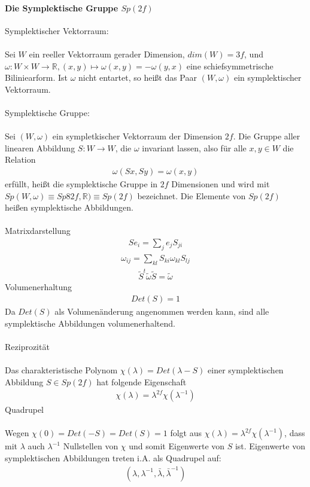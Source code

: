 \documentclass[10pt,a4paper]{article}
\begin{document}
\paragraph{Die Symplektische Gruppe $Sp(2f)$} $\,$\\
Symplektischer Vektorraum:\\
\\
Sei $W$ ein reeller Vektorraum gerader Dimension, $dim(W)=3f$, und $\omega: W \times W \longrightarrow \mathbb{R}, (x,y) \longmapsto \omega (x,y)=-\omega (y,x) $ eine schiefsymmetrische Biliniearform. Ist $\omega
$ nicht entartet, so heißt das Paar $ (W,\omega)$ ein symplektischer Vektorraum.\\
\\
Symplektische Gruppe: \\
\\
Sei $(W,\omega)$ ein sympletkischer Vektorraum der Dimension $2f$. Die Gruppe aller linearen Abbildung $S:W \longrightarrow W$, die $\omega$ invariant lassen, also für alle $x,y \in W$ die Relation
\begin{align}
\omega(Sx,Sy)=\omega(x,y)
\end{align}
erfüllt, heißt die symplektische Gruppe in $2f$ Dimensionen und wird mit $ Sp(W,\omega) \equiv Sp82f, \mathbb{R}) \equiv Sp(2f)$ bezeichnet. Die Elemente von $Sp(2f) $ heißen symplektische Abbildungen.\\
\\
Matrixdarstellung
\begin{align}
Se_i= \sum_j e_j S_{ji}
\end{align}
\begin{align}
\omega_{ij}=\sum_{kl} S_{ki}\omega_{kl} S_{lj}
\end{align}
\begin{align}
\tilde{S}^t \tilde{\omega} \tilde{S}= \tilde{\omega}
\end{align}
Volumenerhaltung
\begin{align}
Det(S)=1
\end{align}
Da $Det(S)$ als Volumenänderung angenommen werden kann, sind alle symplektische Abbildungen volumenerhaltend.\\
\\
Reziprozität\\
\\
Das charakteristische Polynom $\chi(\lambda) = Det(\lambda-S) $ einer symplektischen Abbildung $S \in Sp(2f) $ hat folgende Eigenschaft
\begin{align}
\chi (\lambda) = \lambda^{2f} \chi (\lambda^{-1})
\end{align}
Quadrupel\\
\\
Wegen $ \chi(0) = Det(-S) = Det(S)=1 $ folgt aus $ \chi(\lambda)=\lambda^{2f} \chi (\lambda^{-1})$, dass mit $\lambda $ auch $ \lambda^{-1}$ Nullstellen von $\chi$ und somit Eigenwerte von $S$ ist.
Eigenwerte von symplektischen Abbildungen treten i.A. als Quadrupel auf:
\begin{align}
(\lambda, \lambda^{-1}, \bar{\lambda}, \bar{\lambda}^{-1})
\end{align}
\end{document}
